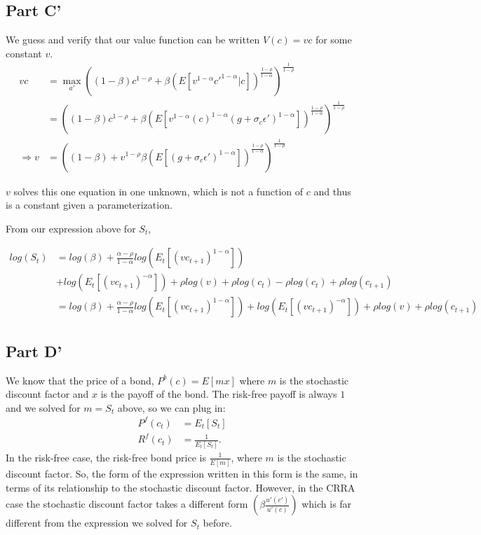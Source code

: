\documentclass[11pt]{article} %
\begin{document}
\subsection{Part C'}
We guess and verify that our value function can be written $V(c) = vc$ for some constant $v$.
\begin{align*}
vc&= \max_{a'} ((1-\beta) c^{1-\rho} + \beta (E [ v^{1-\alpha}c'^{1-\alpha}|c ])^{\frac{1-\rho}{1-\alpha}})^{\frac{1}{1-\rho}}\\
&=( (1-\beta) c^{1-\rho} + \beta(E [ v^{1-\alpha}(c)^{1-\alpha}(g+\sigma_c \epsilon ')^{1-\alpha} ])^{\frac{1-\rho}{1-\alpha}})^{\frac{1}{1-\rho}}\\
\Rightarrow v &= ( (1-\beta)  + v^{1-\rho}\beta(E [ (g+\sigma_c \epsilon ')^{1-\alpha} ])^{\frac{1-\rho}{1-\alpha}})^{\frac{1}{1-\rho}}
\end{align*}

$v$ solves this one equation in one unknown, which is not a function of $c$ and thus is a constant given a parameterization.

From our expression above for $S_t$,

\begin{align*}
log(S_t) &= log(\beta)+\frac{\alpha - \rho}{1-\alpha}log(E_t[(vc_{t+1})^{1-\alpha}]) \\
&+log(E_t[(vc_{t+1})^{-\alpha}]) + \rho log(v) + \rho log(c_t) - \rho log(c_t) + \rho log(c_{t+1})\\
&=log(\beta)+\frac{\alpha - \rho}{1-\alpha}log(E_t[(vc_{t+1})^{1-\alpha}]) +log(E_t[(vc_{t+1})^{-\alpha}]) + \rho log(v) + \rho log(c_{t+1})
\end{align*} 
\subsection{Part D'}
We know that the price of a bond, $P^b(c) = E[mx]$ where $m$ is the stochastic discount factor and $x$ is the payoff of the bond. The risk-free payoff is always $1$ and we solved for $m = S_t$ above, so we can plug in:
\begin{align*}
P^f(c_t) &= E_t[S_t] \\
R^f(c_t) &= \frac{1}{E_t[S_t]}.
\end{align*}
In the risk-free case, the risk-free bond price is $\frac{1}{E[m]}$, where $m$ is the stochastic discount factor. So, the form of the expression written in this form is the same, in terms of its relationship to the stochastic discount factor. However, in the CRRA case the stochastic discount factor takes a different form $\left( \beta\frac{u'(c')}{u'(c)} \right)$ which is far different from the expression we solved for $S_t$ before.
\end{document}
